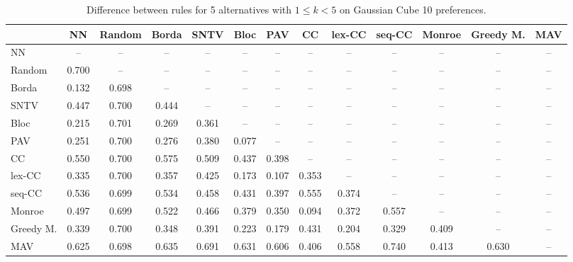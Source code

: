 
\begin{table*}[htbp]
\centering
\begin{tabular}{lcccccccccccc}
\toprule
 & NN & Random & Borda & SNTV & Bloc & PAV & CC & lex-CC & seq-CC & Monroe & Greedy M. & MAV \\
\midrule
NN & -- & -- & -- & -- & -- & -- & -- & -- & -- & -- & -- & -- \\
Random & \cellcolor{blue!70} 0.700 & -- & -- & -- & -- & -- & -- & -- & -- & -- & -- & -- \\
Borda & \cellcolor{blue!13} 0.132 & \cellcolor{blue!69} 0.698 & -- & -- & -- & -- & -- & -- & -- & -- & -- & -- \\
SNTV & \cellcolor{blue!44} 0.447 & \cellcolor{blue!70} 0.700 & \cellcolor{blue!44} 0.444 & -- & -- & -- & -- & -- & -- & -- & -- & -- \\
Bloc & \cellcolor{blue!21} 0.215 & \cellcolor{blue!70} 0.701 & \cellcolor{blue!26} 0.269 & \cellcolor{blue!36} 0.361 & -- & -- & -- & -- & -- & -- & -- & -- \\
PAV & \cellcolor{blue!25} 0.251 & \cellcolor{blue!70} 0.700 & \cellcolor{blue!27} 0.276 & \cellcolor{blue!38} 0.380 & \cellcolor{blue!7} 0.077 & -- & -- & -- & -- & -- & -- & -- \\
CC & \cellcolor{blue!55} 0.550 & \cellcolor{blue!70} 0.700 & \cellcolor{blue!57} 0.575 & \cellcolor{blue!50} 0.509 & \cellcolor{blue!43} 0.437 & \cellcolor{blue!39} 0.398 & -- & -- & -- & -- & -- & -- \\
lex-CC & \cellcolor{blue!33} 0.335 & \cellcolor{blue!70} 0.700 & \cellcolor{blue!35} 0.357 & \cellcolor{blue!42} 0.425 & \cellcolor{blue!17} 0.173 & \cellcolor{blue!10} 0.107 & \cellcolor{blue!35} 0.353 & -- & -- & -- & -- & -- \\
seq-CC & \cellcolor{blue!53} 0.536 & \cellcolor{blue!69} 0.699 & \cellcolor{blue!53} 0.534 & \cellcolor{blue!45} 0.458 & \cellcolor{blue!43} 0.431 & \cellcolor{blue!39} 0.397 & \cellcolor{blue!55} 0.555 & \cellcolor{blue!37} 0.374 & -- & -- & -- & -- \\
Monroe & \cellcolor{blue!49} 0.497 & \cellcolor{blue!69} 0.699 & \cellcolor{blue!52} 0.522 & \cellcolor{blue!46} 0.466 & \cellcolor{blue!37} 0.379 & \cellcolor{blue!35} 0.350 & \cellcolor{blue!9} 0.094 & \cellcolor{blue!37} 0.372 & \cellcolor{blue!55} 0.557 & -- & -- & -- \\
Greedy M. & \cellcolor{blue!33} 0.339 & \cellcolor{blue!70} 0.700 & \cellcolor{blue!34} 0.348 & \cellcolor{blue!39} 0.391 & \cellcolor{blue!22} 0.223 & \cellcolor{blue!17} 0.179 & \cellcolor{blue!43} 0.431 & \cellcolor{blue!20} 0.204 & \cellcolor{blue!32} 0.329 & \cellcolor{blue!40} 0.409 & -- & -- \\
MAV & \cellcolor{blue!62} 0.625 & \cellcolor{blue!69} 0.698 & \cellcolor{blue!63} 0.635 & \cellcolor{blue!69} 0.691 & \cellcolor{blue!63} 0.631 & \cellcolor{blue!60} 0.606 & \cellcolor{blue!40} 0.406 & \cellcolor{blue!55} 0.558 & \cellcolor{blue!74} 0.740 & \cellcolor{blue!41} 0.413 & \cellcolor{blue!63} 0.630 & -- \\
\bottomrule
\end{tabular}

\caption{Difference between rules for 5 alternatives with $1 \leq k < 5$ on Gaussian Cube 10 preferences.}
\label{tab:rule_distance_heatmap-m=[5]-pref_dist=euclidean__args__dimensions=10_-_space=gaussian_cube}
\end{table*}
    